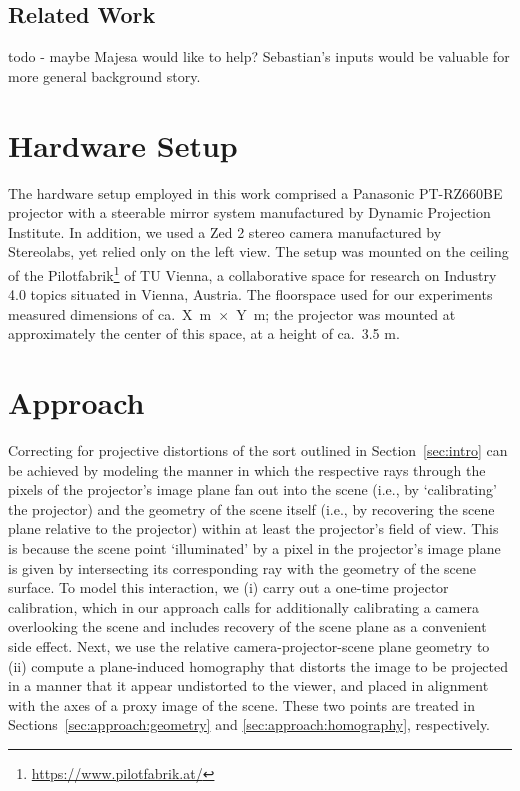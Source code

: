 \documentclass[review]{elsarticle}
\begin{document}
\subsection{Related Work}

todo - maybe Majesa would like to help? Sebastian's inputs would be valuable for more general background story.

\section{Hardware Setup}

The hardware setup employed in this work comprised a Panasonic PT-RZ660BE projector with a steerable mirror system manufactured by Dynamic Projection Institute. In addition, we used a Zed 2 stereo camera manufactured by Stereolabs, yet relied only on the left view. The setup was mounted on the ceiling of the Pilotfabrik\footnote{\url{https://www.pilotfabrik.at/}} of TU Vienna, a collaborative space for research on Industry 4.0 topics situated in Vienna, Austria. The floorspace used for our experiments measured dimensions of ca.\ X~m~$\times$~Y~m; the projector was mounted at approximately the center of this space, at a height of ca.\ 3.5 m. 

\section{Approach}

Correcting for projective distortions of the sort outlined in Section~\ref{sec:intro} can be achieved by modeling the manner in which the respective rays through the pixels of the projector's image plane fan out into the scene (i.e., by `calibrating' the projector) and the geometry of the scene itself (i.e., by recovering the scene plane relative to the projector) within at least the projector's field of view. This is because the scene point `illuminated' by a pixel in the projector's image plane is given by intersecting its corresponding ray with the geometry of the scene surface. To model this interaction, we (i) carry out a one-time projector calibration, which in our approach calls for additionally calibrating a camera overlooking the scene and includes recovery of the scene plane as a convenient side effect. Next, we use the relative camera-projector-scene plane geometry to (ii) compute a plane-induced homography that distorts the image to be projected in a manner that it appear undistorted to the viewer, and placed in alignment with the axes of a proxy image of the scene. These two points are treated in Sections~\ref{sec:approach:geometry} and \ref{sec:approach:homography}, respectively.
\end{document}
